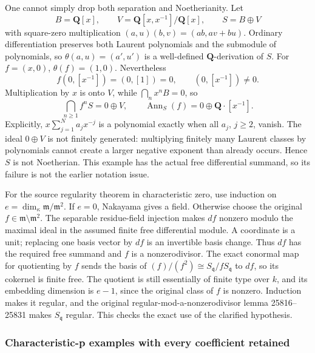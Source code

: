 One cannot simply drop both separation and Noetherianity. Let \[
B=\mathbf Q[x],\qquad
V=\mathbf Q[x,x^{-1}]/\mathbf Q[x],\qquad
S=B\oplus V
\] with square-zero multiplication \((a,u)(b,v)=(ab,av+bu)\). Ordinary differentiation preserves both Laurent polynomials and the submodule of polynomials, so \(\theta(a,u)=(a',u')\) is a well-defined \(\mathbf Q\)-derivation of \(S\). For \(f=(x,0)\), \(\theta(f)=(1,0)\). Nevertheless \[
f(0,[x^{-1}])=(0,[1])=0,\qquad (0,[x^{-1}])\ne0.
\] Multiplication by \(x\) is onto \(V\), while \(\bigcap_nx^nB=0\), so \[
\bigcap_{n\ge1}f^nS=0\oplus V,\qquad
\operatorname{Ann}_S(f)=0\oplus\mathbf Q\cdot[x^{-1}].
\] Explicitly, \(x\sum_{j=1}^N a_jx^{-j}\) is a polynomial exactly when all \(a_j\), \(j\ge2\), vanish. The ideal \(0\oplus V\) is not finitely generated: multiplying finitely many Laurent classes by polynomials cannot create a larger negative exponent than already occurs. Hence \(S\) is not Noetherian. This example has the actual free differential summand, so its failure is not the earlier notation issue.

For the source regularity theorem in characteristic zero, use induction on \(e=\dim_\kappa\mathfrak m/\mathfrak m^2\). If \(e=0\), Nakayama gives a field. Otherwise choose the original \(f\in\mathfrak m\setminus\mathfrak m^2\). The separable residue-field injection makes \(df\) nonzero modulo the maximal ideal in the assumed finite free differential module. A coordinate is a unit; replacing one basis vector by \(df\) is an invertible basis change. Thus \(df\) has the required free summand and \(f\) is a nonzerodivisor. The exact conormal map for quotienting by \(f\) sends the basis of \((f)/(f^2)\cong S_{\mathfrak q}/fS_{\mathfrak q}\) to \(df\), so its cokernel is finite free. The quotient is still essentially of finite type over \(k\), and its embedding dimension is \(e-1\), since the original class of \(f\) is nonzero. Induction makes it regular, and the original regular-mod-a-nonzerodivisor lemma 25816--25831 makes \(S_{\mathfrak q}\) regular. This checks the exact use of the clarified hypothesis.

\subsubsection{Characteristic-p examples with every coefficient retained}\label{characteristic-p-examples-with-every-coefficient-retained}

